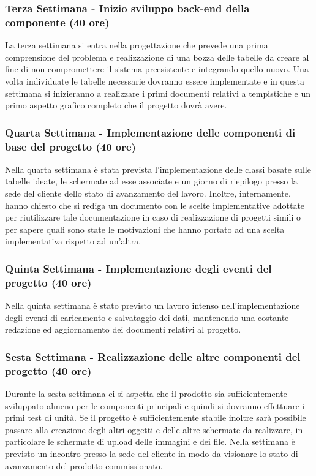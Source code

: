 \subsubsection*{Terza Settimana - Inizio sviluppo back-end della componente (40 ore)}
La terza settimana si entra nella progettazione che prevede una prima comprensione del problema e realizzazione di una bozza delle tabelle da creare al fine di non compromettere il sistema preesistente e integrando quello nuovo. Una volta individuate le tabelle necessarie dovranno essere implementate e in questa settimana si inizieranno a realizzare i primi documenti relativi a tempistiche e un primo aspetto grafico completo che il progetto dovrà avere.

\subsubsection*{Quarta Settimana - Implementazione delle componenti di base del progetto  (40 ore)}
Nella quarta settimana è stata prevista l'implementazione delle classi basate sulle tabelle ideate, le schermate ad esse associate e un giorno di riepilogo presso la sede del cliente dello stato di avanzamento del lavoro. Inoltre, internamente, hanno chiesto che si rediga un documento con le scelte implementative adottate per riutilizzare tale documentazione in caso di realizzazione di progetti simili o per sapere quali sono state le motivazioni che hanno portato ad una scelta implementativa rispetto ad un'altra.

\subsubsection*{Quinta Settimana - Implementazione degli eventi del progetto (40 ore)}
Nella quinta settimana è stato previsto un lavoro intenso nell'implementazione degli eventi di caricamento e salvataggio dei dati, mantenendo una costante redazione ed aggiornamento dei documenti relativi al progetto.

\subsubsection*{Sesta Settimana - Realizzazione delle altre componenti del progetto (40 ore)}
Durante la sesta settimana ci si aspetta che il prodotto sia sufficientemente sviluppato almeno per le componenti principali e quindi si dovranno effettuare i primi test di unità. Se il progetto è sufficientemente stabile inoltre sarà possibile passare alla creazione degli altri oggetti e delle altre schermate da realizzare, in particolare le schermate di upload delle immagini e dei file.
Nella settimana è previsto un incontro presso la sede del cliente in modo da visionare lo stato di avanzamento del prodotto commissionato.

